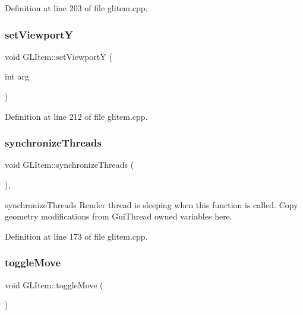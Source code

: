 Definition at line 203 of file glitem.\+cpp.

\mbox{\label{class_g_l_item_a9e93a59b34064c9417b3470373b9d0d7}} 
\subsubsection{\texorpdfstring{setViewportY}{setViewportY}}
{\footnotesize\ttfamily void G\+L\+Item\+::set\+ViewportY (\begin{DoxyParamCaption}\item[{int}]{arg }\end{DoxyParamCaption})\hspace{0.3cm}{\ttfamily [slot]}}



Definition at line 212 of file glitem.\+cpp.

\mbox{\label{class_g_l_item_a790da330a5b53f0156c144b68eff20c2}} 
\subsubsection{\texorpdfstring{synchronizeThreads}{synchronizeThreads}}
{\footnotesize\ttfamily void G\+L\+Item\+::synchronize\+Threads (\begin{DoxyParamCaption}{ }\end{DoxyParamCaption})\hspace{0.3cm}{\ttfamily [protected]}, {\ttfamily [slot]}}



synchronize\+Threads Render thread is sleeping when this function is called. Copy geometry modifications from Gui\+Thread owned variables here. 



Definition at line 173 of file glitem.\+cpp.

\mbox{\label{class_g_l_item_acd4f1c0f42402d1cb09e83f1051703cc}} 
\subsubsection{\texorpdfstring{toggleMove}{toggleMove}}
{\footnotesize\ttfamily void G\+L\+Item\+::toggle\+Move (\begin{DoxyParamCaption}{ }\end{DoxyParamCaption})\hspace{0.3cm}{\ttfamily [slot]}}



